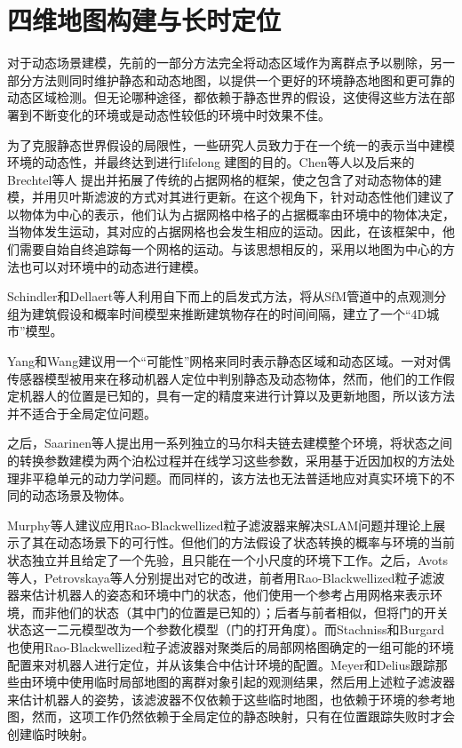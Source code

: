 \section{四维地图构建与长时定位}
\label{subsec:4Dmapping}
对于动态场景建模，先前的一部分方法完全将动态区域作为离群点予以剔除，另一部分方法则同时维护静态和动态地图，以提供一个更好的环境静态地图和更可靠的动态区域检测。但无论哪种途径，都依赖于静态世界的假设，这使得这些方法在部署到不断变化的环境或是动态性较低的环境中时效果不佳。

为了克服静态世界假设的局限性，一些研究人员致力于在一个统一的表示当中建模环境的动态性，并最终达到进行lifelong 建图的目的。Chen等人\cite{Chen2006Dynamic}以及后来的Brechtel等人\cite{Brechtel2010Recursive} 提出并拓展了传统的占据网格的框架，使之包含了对动态物体的建模，并用贝叶斯滤波的方式对其进行更新。在这个视角下，针对动态性他们建议了以物体为中心的表示，他们认为占据网格中格子的占据概率由环境中的物体决定，当物体发生运动，其对应的占据网格也会发生相应的运动。因此，在该框架中，他们需要自始自终追踪每一个网格的运动。与该思想相反的，采用以地图为中心的方法也可以对环境中的动态进行建模。

Schindler和Dellaert等人\cite{Schindler2010Probabilistic}利用自下而上的启发式方法，将从SfM管道中的点观测分组为建筑假设和概率时间模型来推断建筑物存在的时间间隔，建立了一个“4D城市”模型。

Yang和Wang\cite{Yang2011Feasibility}建议用一个“可能性”网格来同时表示静态区域和动态区域。一对对偶传感器模型被用来在移动机器人定位中判别静态及动态物体，然而，他们的工作假定机器人的位置是已知的，具有一定的精度来进行计算以及更新地图，所以该方法并不适合于全局定位问题。

之后，Saarinen\cite{Saarinen2012Independent}等人提出用一系列独立的马尔科夫链去建模整个环境，将状态之间的转换参数建模为两个泊松过程并在线学习这些参数，采用基于近因加权的方法处理非平稳单元的动力学问题。而同样的，该方法也无法普适地应对真实环境下的不同的动态场景及物体。

Murphy\cite{Murphy1999Bayesian}等人建议应用Rao-Blackwellized粒子滤波器来解决SLAM问题并理论上展示了其在动态场景下的可行性。但他们的方法假设了状态转换的概率与环境的当前状态独立并且给定了一个先验，且只能在一个小尺度的环境下工作。之后，Avots等人\cite{Avots2002A}，Petrovskaya\cite{Petrovskaya2007Probabilistic}等人分别提出对它的改进，前者用Rao-Blackwellized粒子滤波器来估计机器人的姿态和环境中门的状态，他们使用一个参考占用网格来表示环境，而非他们的状态（其中门的位置是已知的）；后者与前者相似，但将门的开关状态这一二元模型改为一个参数化模型（门的打开角度）。而Stachniss和Burgard\cite{Stachniss2005Mobile}也使用Rao-Blackwellized粒子滤波器对聚类后的局部网格图确定的一组可能的环境配置来对机器人进行定位，并从该集合中估计环境的配置。Meyer和Delius\cite{Meyer2010Temporary}跟踪那些由环境中使用临时局部地图的离群对象引起的观测结果，然后用上述粒子滤波器来估计机器人的姿势，该滤波器不仅依赖于这些临时地图，也依赖于环境的参考地图，然而，这项工作仍然依赖于全局定位的静态映射，只有在位置跟踪失败时才会创建临时映射。


